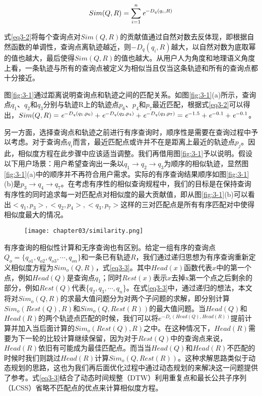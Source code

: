\begin{equation}
	\label{eq3-2}
	Sim(Q,R) = \sum_{i=1}^{n} \emph{e}^{-D_{q}(q_{i}, R)}
\end{equation}

式\ref{eq3-2}将每个查询点对$Sim(Q,R)$的贡献值通过自然对数去反体现，即根据自然函数的单调性，查询点离轨迹越近，则$-D_{q}(q_{i}, R)$越大，以自然对数为底取幂的值也越大，最后使得$Sim(Q,R)$的值也越大。从用户人为角度和地理语义角度上看，一条轨迹与所有的查询点被定义为相似当且仅当这条轨迹和所有的查询点都十分接近。

图\ref{fig:3-1}通过距离说明查询点和轨迹之间的匹配关系。如图\ref{fig:3-1}(a)所示，查询点$q_{1}$、$q_{2}$和$q_{3}$分别与轨迹R上的轨迹点$p_{6}$、$p_{4}$和$p_{7}$最近匹配，根据式\ref{eq3-2}可以得出，$Sim(Q,R) = \emph{e}^{-D_{q}(q_{1}, p_{6})} + \emph{e}^{-D_{q}(q_{2}, p_{4})} + \emph{e}^{-D_{q}(q_{3}, p_{7})} = \emph{e}^{-1.5}+ \emph{e}^{-0.1} + \emph{e}^{-0.1}$。

另一方面，选择查询点和轨迹之前进行有序查询时，顺序性是需要在查询过程中予以考虑。对于查询点$q_{i}$而言，最近匹配点或许并不在是距离上最近的轨迹点$p_{j}$。因此，相似度方程在此步骤中应该适当调整。我们再借用图\ref{fig:3-1}予以说明。假设以下用户场景：用户希望查询出一条以$q_{1} \rightarrow q_{2} \rightarrow q_{3}$为顺序的相似轨迹，显然图\ref{fig:3-1}(a)中的顺序并不再符合用户需求。实际的有序查询结果顺序如图\ref{fig:3-1}(b)是$p_{3} \rightarrow q_{4} \rightarrow q_{7}$。在考虑有序性的相似查询规程中，我们的目标是在保持查询有序性的同时追求每一对匹配点对相似度的最大贡献值，即从图\ref{fig:3-1}(b)可以看出$<q_{1},p_{3}>, <q_{2},p_{4}>, <q_{3},p_{7}>$这样的三对匹配点是所有有序匹配对中使得相似度最大的情况。

\begin{figure}[!htp]
  \centering
  \texttt{[image: chapter03/similarity.png]}
\end{figure}

有序查询的相似性计算和无序查询也有区别。给定一组有序的查询点$Q_{o} = \{q_{o1},q_{o2},q_{o3},\cdots, q_{on}\}$和一条已有轨迹$R$，我们通过递归思想为有序查询重新定义相似度方程为$Sim_{o}(Q,R)$，式\ref{eq3-3}。其中$Head(x)$函数代表$x$中的第一个点，例如$Head(Q)$是查询点$q_{1}$；同时$Rest(x)$表示$x$去掉x第一个点之后剩余的部分，例如$Rest(Q)$代表\{$q_{2},q_{3},\cdots, q_{n}$\}。在式\ref{eq3-3}中，通过递归的想法，本文将对$Sim_{o}(Q,R)$的求最大值问题分为对两个子问题的求解，即分别计算$Sim_{o}(Rest(Q),R)$和$Sim_{o}(Q,Rest(R))$的最大值问题。当$Head(Q)$和$Head(R)$的两个轨迹点匹配的时候，我们可以将$e^{-D_{e}(Head(Q), Head(R))}$提前计算并加入当后面计算的$Sim_{o}(Rest(Q),R)$之中。在这种情况下，$Head(R)$需要为下一轮的比较计算继续保留，因为对于$Rest(Q)$中的查询点来说，$Head(R)$依旧有可能成为最佳匹配点。而当当$Head(Q)$和$Head(R)$不匹配的时候时我们则跳过$Head(R)$计算$Sim_{o}(Q,Rest(R))$。这种求解思路类似于动态规划的思路，这也为我们再后面优化过程中通过动态规划的来解决这一问题提供了参考。式\ref{eq3-3}结合了动态时间规整（DTW）利用重复点和最长公共子序列（LCSS）省略不匹配点的优点来计算相似度方程。

